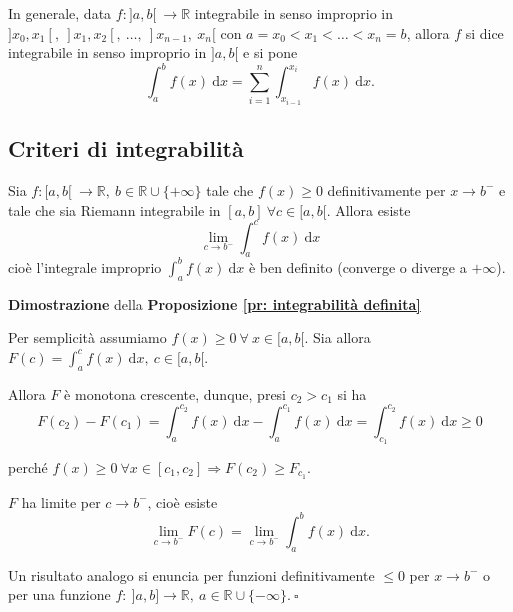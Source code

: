 In generale, data $f:]a,b[ \ \rightarrow \mathbb{R}$ integrabile in senso improprio in $]x_0,x_1[, \ ]x_1,x_2[, \ \ldots, \ ]x_{n-1}, \ x_n[$ con $a = x_0 < x_1 < \ldots < x_n = b$, allora $f$ si dice integrabile in senso improprio in $]a,b[$ e si pone 
\begin{equation*}
	\int_{a}^{b} f(x) \ \mathrm{d}x= \sum_{i=1}^{n} \int_{x_{i-1}}^{x_i} f(x) \ \mathrm{d}x.
\end{equation*}

\subsection{Criteri di integrabilità}
\begin{proposition}
	\label{pr: integrabilità definita}
	Sia $f:[a,b[ \ \rightarrow \mathbb{R}, \ b \in \mathbb{R} \cup \{+\infty\}$ tale che $f(x) \geq 0$ definitivamente per $x \rightarrow b^-$ e tale che sia Riemann integrabile in $[a,b] \ \forall c \in [a,b[$. Allora esiste
	\begin{equation*}
		\lim_{c \rightarrow b^-} \int_{a}^{c} f(x) \ \mathrm{d}x
 	\end{equation*}
	cioè l'integrale improprio $\int_{a}^{b} f(x) \ \mathrm{d}x$ è ben definito (converge o diverge a $+\infty$).
\end{proposition}

\begin{dembar}
	\textbf{Dimostrazione} della \textbf{Proposizione \ref{pr: integrabilità definita}}
	
	
	Per semplicità assumiamo $f(x) \geq 0 \ \forall \ x \in [a,b[$. Sia allora $F(c)=\int_{a}^{c} f(x) \ \mathrm{d}x, \ c \in [a,b[$. 
	
	Allora $F$ è monotona crescente, dunque, presi $c_2 > c_1$ si ha
	\begin{equation*}
		F(c_2) - F(c_1) = \int_{a}^{c_2} f(x) \ \mathrm{d}x - \int_{a}^{c_1} f(x) \ \mathrm{d}x = \int_{c_1}^{c_2} f(x) \ \mathrm{d}x \geq 0
	\end{equation*}
	
	perché $f(x) \geq 0 \ \forall x \in [c_1,c_2] \Rightarrow F(c_2) \geq F_{c_1}$.
	
	$F$ ha limite per $c \rightarrow b^-$, cioè esiste
	\begin{equation*}
		\lim_{c \rightarrow b^-} F(c) = \lim_{c \rightarrow b^-} \int_{a}^{b} f(x) \ \mathrm{d}x.
	\end{equation*}
	
	Un risultato analogo si enuncia per funzioni definitivamente $\leq 0$ per $ x \rightarrow b^-$ o per una funzione $f: \ ]a,b] \rightarrow \mathbb{R}, \ a \in \mathbb{R} \cup \{-\infty\}. \ \square$ 
\end{dembar}



